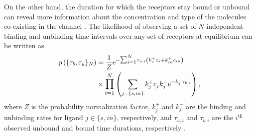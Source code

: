 \documentclass[twocolumn]{IEEEtran}
\newcommand{\p}{\mathrm{p}}
\newcommand{\e}{\mathrm{e}}
\begin{document}
On the other hand, the duration for which the receptors stay bound or unbound can reveal more information about the concentration and type of the molecules co-existing in the channel \cite{kuscu2019channel}. The likelihood of observing a set of $N$ independent binding and unbinding time intervals over any set of receptors at equilibrium can be written as
\begin{align}\label{eq:likelihood1}
\p\left(\{\tau_b,\tau_u \}_{N}\right) &= \frac{1}{Z} \e^{-\mathlarger{\sum_{i=1}^N} \tau_{u,i} \left( k_s^+ c_s + k_{in}^+ c_{in} \right)}  \\ \nonumber
& \times \mathlarger{\prod_{i=1}^{N}}  \left(\sum_{j=\{s, in\}} k_j^+ c_j k_j^- \e^{-k_j^- \tau_{b,i}} \right),
\end{align}
where $Z$ is the probability normalization factor, $k_j^+$ and $k_j^-$ are the binding and unbinding rates for ligand $j \in \{s,in \}$, respectively, and $\tau_{u,i}$ and $\tau_{b,i}$ are the $i^\text{th}$ observed unbound and bound time durations, respectively \cite{mora2015physical}. 

\end{document}
